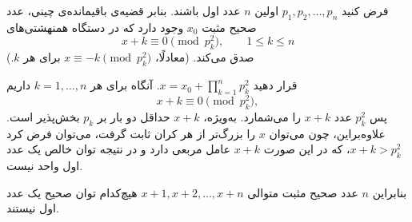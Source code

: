 فرض کنید $p_1, p_2, \dots, p_n$ اولین $n$ عدد اول باشند. بنابر قضیه‌ی باقیمانده‌ی چینی، عدد صحیح مثبت $x_0$ وجود دارد که در دستگاه همنهشتی‌های
\[
x + k \equiv 0 \pmod{p_k^2}, \qquad 1 \leq k \leq n
\]
صدق می‌کند. (معادلًا، $x \equiv -k \pmod{p_k^2}$ برای هر $k$.)

قرار دهید $x = x_0 + \prod_{k=1}^n p_k^2$. آنگاه برای هر $k = 1, \dots, n$ داریم
\[
x + k \equiv 0 \pmod{p_k^2},
\]
پس $p_k^2$ عدد $x + k$ را می‌شمارد. به‌ویژه، $x + k$ حداقل دو بار بر $p_k$ بخش‌پذیر است. علاوه‌براین، چون می‌توان $x$ را بزرگ‌تر از هر کران ثابت گرفت، می‌توان فرض کرد $x + k > p_k^2$، که در این صورت $x + k$ عامل مربعی دارد و در نتیجه توان خالص یک عدد اول واحد نیست.

بنابراین $n$ عدد صحیح مثبت متوالی $x+1, x+2, \dots, x+n$ هیچ‌کدام توان صحیح یک عدد اول نیستند.
